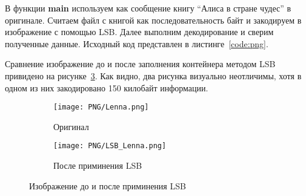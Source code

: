 В функции \textbf{main} используем как сообщение книгу ``Алиса в стране чудес'' в оригинале.
Считаем файл с книгой как последовательность байт и закодируем в изображение с помощью LSB.
Далее выполним декодирование и сверим полученные данные.
Исходный код представлен в листинге~\ref{code:png}.

Сравнение изображение до и после заполнения контейнера методом LSB
привидено на рисунке~\ref{img:lsb}.
Как видно, два рисунка визуально неотличимы,
хотя в одном из них закодировано 150 килобайт информации.
\begin{figure}[ht!]
    \centering
    \begin{subfigure}{.5\textwidth}
      \centering
      \texttt{[image: PNG/Lenna.png]}
      \caption{Оригинал}
      \label{img:lenna-png}
    \end{subfigure}%
    \begin{subfigure}{.5\textwidth}
      \centering
      \texttt{[image: PNG/LSB\_Lenna.png]}
      \caption{После приминения LSB}
      \label{img:lenna-lsb}
    \end{subfigure}
    \caption{Изображение до и после приминения LSB}
    \label{img:lsb}
\end{figure}